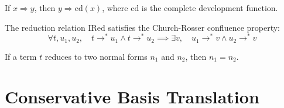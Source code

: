 \begin{theorem}
If $x \Rightarrow y$, then $y \Rightarrow \text{cd}(x)$, where $\text{cd}$ is the complete development function.
\end{theorem}

\begin{theorem}
The reduction relation $\text{IRed}$ satisfies the Church-Rosser confluence property:
$$\forall t, u_1, u_2, \quad t \to^* u_1 \land t \to^* u_2 \implies \exists v, \quad u_1 \to^* v \land u_2 \to^* v$$
\end{theorem}

\begin{theorem}
If a term $t$ reduces to two normal forms $n_1$ and $n_2$, then $n_1 = n_2$.
\end{theorem}

\section{Conservative Basis Translation}

